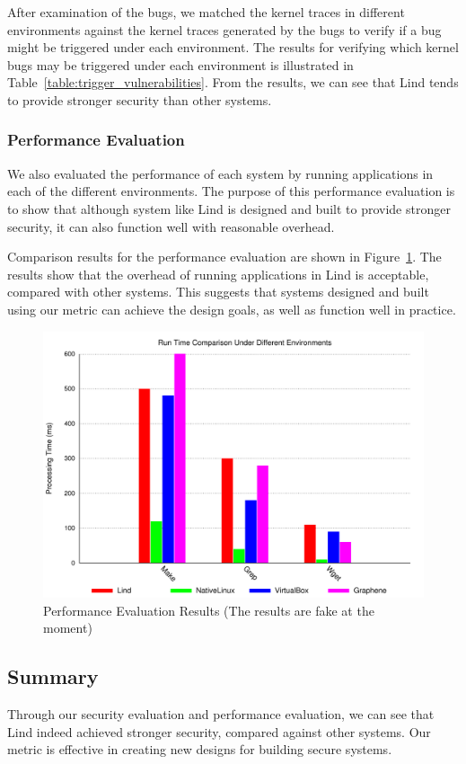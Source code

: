 After examination of the bugs, we matched the kernel traces in different environments against the kernel traces generated 
by the bugs to verify if a bug might be triggered under each environment. 
%
The results for verifying which kernel bugs may be triggered under each environment is illustrated in Table~\ref{table:trigger_vulnerabilities}.
From the results, we can see that Lind tends to provide stronger security than other systems.  


\subsubsection{Performance Evaluation}
We also evaluated the performance of each system by running applications in each of the different environments.
The purpose of this performance evaluation is to show that although system like Lind is designed and built to provide stronger
security, it can also function well with reasonable overhead. 

Comparison results for the performance evaluation are shown in Figure~\ref{fig:performance_evaluation_results}.
The results show that the overhead of running applications in Lind is acceptable, compared with other systems. 
This suggests that systems designed and built using our metric can achieve the design goals, as well as function well in practice. 

\begin{figure}%
\centering
\includegraphics[width=1.0\columnwidth]{diagram/lind_ccs15_diagram_05.pdf}
\caption{Performance Evaluation Results {\color{red}(The results are fake at the moment)}}
\label{fig:performance_evaluation_results}
\end{figure}

\subsection{Summary}
Through our security evaluation and performance evaluation, we can see that 
Lind indeed achieved stronger security, compared against other systems.
Our metric is effective in creating new designs for building secure systems. 

